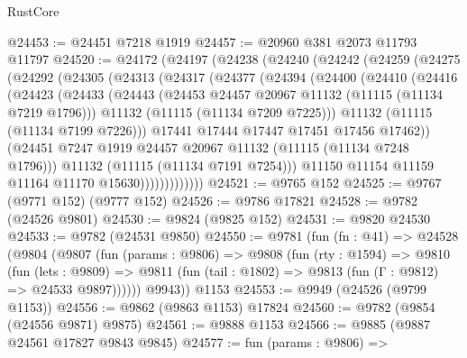 \begin{lexlean}{RustCore}
\begin{coremodule}
@24453 := @24451 @7218 @1919
@24457 := @20960 @381 @2073 @11793 @11797
@24520 := @24172
    (@24197
      (@24238
        (@24240
          (@24242
            (@24259
              (@24275
                (@24292
                  (@24305
                    (@24313
                      (@24317
                        (@24377
                          (@24394
                            (@24400
                              (@24410
                                (@24416
                                  (@24423
                                    (@24433
                                      (@24443
                                        (@24453 @24457 @20967 @11132 (@11115 (@11134 @7219 @1796)))
                                        @11132
                                        (@11115 (@11134 @7209 @7225)))
                                      @11132
                                      (@11115 (@11134 @7199 @7226)))
                                    @17441
                                    @17444
                                    @17447
                                    @17451
                                    @17456
                                    @17462))
                                (@24451
                                  @7247
                                  @1919
                                  @24457
                                  @20967
                                  @11132
                                  (@11115 (@11134 @7248 @1796)))
                                @11132
                                (@11115 (@11134 @7191 @7254)))
                              @11150
                              @11154
                              @11159
                              @11164
                              @11170
                              @15630)))))))))))))
@24521 := @9765 @152
@24525 := @9767 (@9771 @152) (@9777 @152)
@24526 := @9786 @17821
@24528 := @9782 (@24526 @9801)
@24530 := @9824 (@9825 @152)
@24531 := @9820 @24530
@24533 := @9782 (@24531 @9850)
@24550 := @9781
    (fun (fn : @41) =>
    @24528
      (@9804
        (@9807
          (fun (params : @9806) =>
          @9808
            (fun (rty : @1594) =>
            @9810
              (fun (lets : @9809) =>
              @9811 (fun (tail : @1802) => @9813 (fun (Γ : @9812) => @24533 @9897))))))
        @9943))
    @1153
@24553 := @9949 (@24526 (@9799 @1153))
@24556 := @9862 (@9863 @1153) @17824
@24560 := @9782 (@9854 (@24556 @9871) @9875)
@24561 := @9888 @1153
@24566 := @9885 (@9887 @24561 @17827 @9843 @9845)
@24577 := fun (params : @9806) =>

\end{coremodule}
\end{lexlean}
